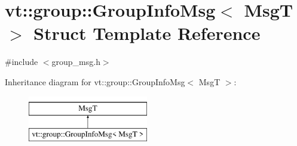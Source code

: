 \hypertarget{structvt_1_1group_1_1_group_info_msg}{}\section{vt\+:\+:group\+:\+:Group\+Info\+Msg$<$ MsgT $>$ Struct Template Reference}
\label{structvt_1_1group_1_1_group_info_msg}


{\ttfamily \#include $<$group\+\_\+msg.\+h$>$}

Inheritance diagram for vt\+:\+:group\+:\+:Group\+Info\+Msg$<$ MsgT $>$\+:\begin{figure}[H]
\begin{center}
\leavevmode
\includegraphics[height=2.000000cm]{structvt_1_1group_1_1_group_info_msg}
\end{center}
\end{figure}
